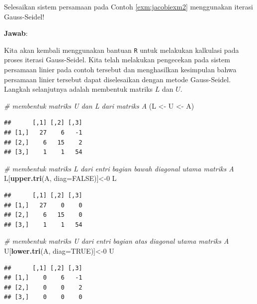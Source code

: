 \documentclass[]{book}
\newenvironment{Shaded}{\begin{snugshade}}{\end{snugshade}}
\newcommand{\CommentTok}[1]{\textcolor[rgb]{0.56,0.35,0.01}{\textit{#1}}}
\newcommand{\DataTypeTok}[1]{\textcolor[rgb]{0.13,0.29,0.53}{#1}}
\newcommand{\DecValTok}[1]{\textcolor[rgb]{0.00,0.00,0.81}{#1}}
\newcommand{\KeywordTok}[1]{\textcolor[rgb]{0.13,0.29,0.53}{\textbf{#1}}}
\newcommand{\NormalTok}[1]{#1}
\newcommand{\OtherTok}[1]{\textcolor[rgb]{0.56,0.35,0.01}{#1}}
\newcommand{\StringTok}[1]{\textcolor[rgb]{0.31,0.60,0.02}{#1}}
\theoremstyle{definition}
\theoremstyle{definition}
\theoremstyle{definition}
\theoremstyle{remark}
\let\BeginKnitrBlock\begin \let\EndKnitrBlock\end
\begin{document}
\BeginKnitrBlock{example}
\protect\hypertarget{exm:gaussseidelexm}{}{\label{exm:gaussseidelexm} }Selesaikan sistem persamaan pada Contoh \ref{exm:jacobiexm2} menggunakan iterasi Gauss-Seidel!
\EndKnitrBlock{example}

\textbf{Jawab}:

Kita akan kembali menggunakan bantuan \texttt{R} untuk melakukan kalkulasi pada proses iterasi Gauss-Seidel. Kita telah melakukan pengecekan pada sistem persamaan linier pada contoh tersebut dan menghasilkan kesimpulan bahwa persamaan linier tersebut dapat diselesaikan dengan metode Gauss-Seidel. Langkah selanjutnya adalah membentuk matriks \(L\) dan \(U\).

\begin{Shaded}
\begin{Highlighting}[]
\CommentTok{# membentuk matriks U dan L dari matriks A}
\NormalTok{(L <-}\StringTok{ }\NormalTok{U <-}\StringTok{ }\NormalTok{A)}
\end{Highlighting}
\end{Shaded}

\begin{verbatim}
##      [,1] [,2] [,3]
## [1,]   27    6   -1
## [2,]    6   15    2
## [3,]    1    1   54
\end{verbatim}

\begin{Shaded}
\begin{Highlighting}[]
\CommentTok{# membentuk matriks L dari entri bagian bawah diagonal utama matriks A}
\NormalTok{L[}\KeywordTok{upper.tri}\NormalTok{(A, }\DataTypeTok{diag=}\OtherTok{FALSE}\NormalTok{)]<-}\DecValTok{0}
\NormalTok{L}
\end{Highlighting}
\end{Shaded}

\begin{verbatim}
##      [,1] [,2] [,3]
## [1,]   27    0    0
## [2,]    6   15    0
## [3,]    1    1   54
\end{verbatim}

\begin{Shaded}
\begin{Highlighting}[]
\CommentTok{# membentuk matriks U dari entri bagian atas diagonal utama matriks A}
\NormalTok{U[}\KeywordTok{lower.tri}\NormalTok{(A, }\DataTypeTok{diag=}\OtherTok{TRUE}\NormalTok{)]<-}\DecValTok{0}
\NormalTok{U}
\end{Highlighting}
\end{Shaded}

\begin{verbatim}
##      [,1] [,2] [,3]
## [1,]    0    6   -1
## [2,]    0    0    2
## [3,]    0    0    0
\end{verbatim}
\end{document}

